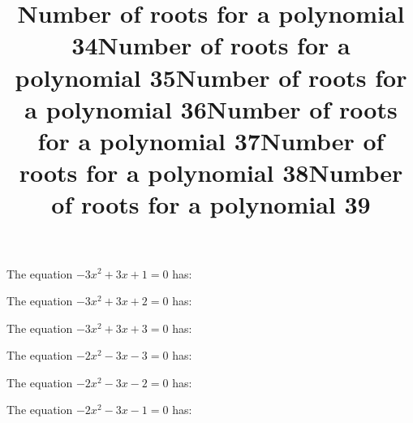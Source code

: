 \documentclass{article}
\begin{document}
\begin{category}
\begin{question}[multichoice]


\end{question}
\begin{question}[multichoice]
\title{Number of roots for a polynomial 34}
The equation $- 3 x^{2} + 3 x + 1=0$ has:



\end{question}
\begin{question}[multichoice]
\title{Number of roots for a polynomial 35}
The equation $- 3 x^{2} + 3 x + 2=0$ has:



\end{question}
\begin{question}[multichoice]
\title{Number of roots for a polynomial 36}
The equation $- 3 x^{2} + 3 x + 3=0$ has:



\end{question}
\begin{question}[multichoice]
\title{Number of roots for a polynomial 37}
The equation $- 2 x^{2} - 3 x - 3=0$ has:



\end{question}
\begin{question}[multichoice]
\title{Number of roots for a polynomial 38}
The equation $- 2 x^{2} - 3 x - 2=0$ has:



\end{question}
\begin{question}[multichoice]
\title{Number of roots for a polynomial 39}
The equation $- 2 x^{2} - 3 x - 1=0$ has:




\end{question}
\end{category}
\end{document}
